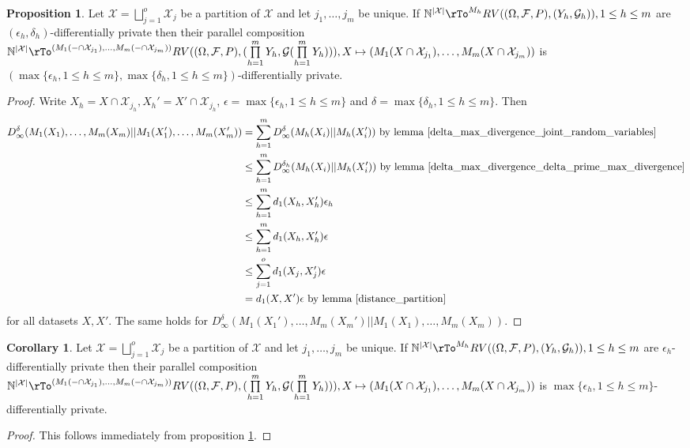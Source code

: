 \documentclass[12pt]{amsart}
\theoremstyle{definition}
\newtheorem{corollary}[theorem]{Corollary}
\newtheorem{proposition}[theorem]{Proposition}
\begin{document}
\begin{proposition} \label{parallel_composition_epsilon_delta} Let $\mathcal{X} = \bigsqcup\limits_{j = 1}^o \mathcal{X}_j$ be a partition of $\mathcal{X}$ and let $j_1, \dots , j_m$ be unique. If $\mathbb{N}^{|\mathcal{X}|} \rTo^{M_h} RV((\Omega, \mathcal{F}, P), (Y_h, \mathcal{G}_h)), 1 \leq h \leq m$ are $(\epsilon_h, \delta_h)$-differentially private then their parallel composition \newline
$\mathbb{N}^{|\mathcal{X}|} \rTo^{(M_1(- \cap \mathcal{X}_{j_1}), \dots , M_m(- \cap \mathcal{X}_{j_m}))} RV((\Omega, \mathcal{F}, P), (\prod\limits_{h = 1}^m Y_h, \mathcal{G}(\prod\limits_{h = 1}^m Y_h))), X \mapsto (M_1(X \cap \mathcal{X}_{j_1}), \dots , M_m(X \cap \mathcal{X}_{j_m}))$ is $(\max\{\epsilon_h, 1 \leq h \leq m\}, \max\{\delta_h, 1 \leq h \leq m\})$-differentially private.
\end{proposition}
\begin{proof} Write $X_h = X \cap \mathcal{X}_{j_h}, X_h' = X' \cap \mathcal{X}_{j_h}$, $\epsilon = \max\{\epsilon_h, 1 \leq h \leq m\}$ and $\delta = \max\{\delta_h, 1 \leq h \leq m\}$. Then
\begin{align*}
D_{\infty}^{\delta} (M_1(X_1), \dots, M_m(X_m) || M_1(X_1' ), \dots , M_m(X_m' )) & = \sum_{h = 1}^m D_{\infty}^{\delta} (M_h(X_i) || M_h(X_i')) \text{ by lemma \ref{delta_max_divergence_joint_random_variables}} \\
 & \leq \sum_{h = 1}^m D_{\infty}^{\delta_h} (M_h(X_i) || M_h(X_i')) \text{ by lemma \ref{delta_max_divergence_delta_prime_max_divergence}} \\
 & \leq \sum_{h = 1}^m d_1(X_h, X_h') \epsilon_h \\
 & \leq \sum_{h = 1}^m d_1(X_h, X_h') \epsilon \\
 & \leq \sum_{j = 1}^o d_1(X_j, X_j') \epsilon \\
 & = d_1(X, X') \epsilon \text{ by lemma \ref{distance_partition}}
\end{align*}
for all datasets $X, X'$. The same holds for $D_{\infty}^{\delta} (M_1(X_1'), \dots, M_m(X_m') || M_1(X_1 ), \dots , M_m(X_m ))$.
\end{proof}

\begin{corollary} \label{parallel_composition_epsilon} Let $\mathcal{X} = \bigsqcup\limits_{j = 1}^o \mathcal{X}_j$ be a partition of $\mathcal{X}$ and let $j_1, \dots , j_m$ be unique. If $\mathbb{N}^{|\mathcal{X}|} \rTo^{M_h} RV((\Omega, \mathcal{F}, P), (Y_h, \mathcal{G}_h)), 1 \leq h \leq m$ are $\epsilon_h$-differentially private then their parallel composition \newline
$\mathbb{N}^{|\mathcal{X}|} \rTo^{(M_1(- \cap \mathcal{X}_{j_1}), \dots , M_m(- \cap \mathcal{X}_{j_m}))} RV((\Omega, \mathcal{F}, P), (\prod\limits_{h = 1}^m Y_h, \mathcal{G}(\prod\limits_{h = 1}^m Y_h))), X \mapsto (M_1(X \cap \mathcal{X}_{j_1}), \dots , M_m(X \cap \mathcal{X}_{j_m}))$ is $\max\{\epsilon_h, 1 \leq h \leq m\}$-differentially private.
\end{corollary}
\begin{proof} This follows immediately from proposition \ref{parallel_composition_epsilon}.
\end{proof}
\end{document}
